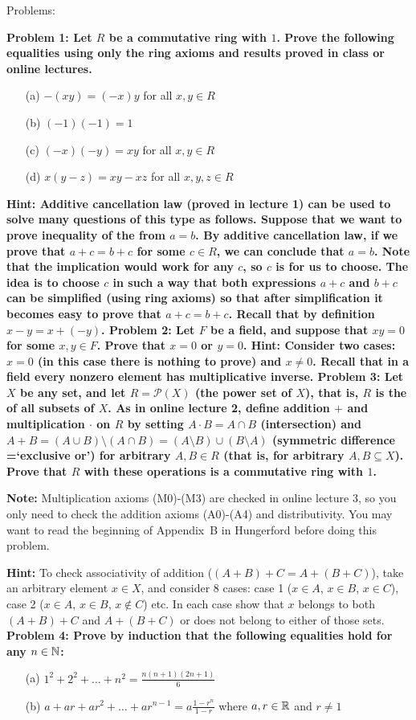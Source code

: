 \documentclass[11pt]{amsart}
\begin{document}
\skv
\bf\centerline{Problems: }\rm
\skv
\bf{Problem 1: }\rm Let $R$ be a commutative ring with $1$.
Prove the following equalities using only the ring axioms and 
results proved  in class or online lectures.
\begin{itemize}
\item[(a)] $-(xy)=(-x)y$ for all $x,y\in R$ 
\item[(b)] $(-1)(-1)=1$ 
\item[(c)] $(-x)(-y)=xy$ for all $x,y\in R$
\item[(d)] $x(y-z)=xy-xz$ for all $x,y,z\in R$ 
\end{itemize}
\bf{Hint: }\rm Additive cancellation law (proved in lecture 1) can be used to solve
many questions of this type as follows. Suppose that we want to prove inequality of
the from $a=b$. By additive cancellation law, if we prove that $a+c=b+c$ for some $c\in R$,
we can conclude that $a=b$. Note that the implication would work for any $c$, so $c$
is for us to choose. The idea is to choose $c$ in such a way that both expressions $a+c$
and $b+c$ can be simplified (using ring axioms) so that after simplification it becomes
easy to prove that $a+c=b+c$.
\skv
Recall that by definition $x-y=x+(-y)$.
\skv
\bf{Problem 2: }\rm Let $F$ be a field, and suppose that
$xy=0$ for some $x,y\in F$. Prove that $x=0$ or $y=0$.
\bf{Hint: }\rm Consider two cases: $x=0$ (in this case there is nothing
to prove) and $x\neq 0$. Recall that in a field every nonzero
element has multiplicative inverse.
\skv
\skv
\bf{Problem 3: }\rm Let $X$ be any set, and let $R=\mathcal P(X)$ (the power set of $X$), that is,
$R$ is the of all subsets of $X$. As in online lecture 2, define addition $+$ and multiplication $\cdot$ on $R$ by setting $A\cdot B=A\cap B$ (intersection) 
and $A+B=(A\cup B)\setminus (A\cap B)=(A\setminus B)\cup (B\setminus A)$ (symmetric difference =`exclusive or') 
for arbitrary $A,B\in R$ (that is, for arbitrary  $A,B\subseteq X$).
Prove that $R$ with these operations is a commutative ring with $1$. 

{\bf Note:} Multiplication axioms (M0)-(M3) are checked in online lecture 3, so you only need
to check the addition axioms (A0)-(A4) and distributivity. You may want to read the beginning of Appendix~B in Hungerford before
doing this problem.


{\bf Hint:} To check associativity of addition ($(A+B)+C=A+(B+C)$), take an arbitrary element $x\in X$,
and consider $8$ cases: case 1 ($x\in A$, $x\in B$, $x\in C$), case 2 ($x\in A$, $x\in B$, $x\not \in C$)
etc. In each case show that $x$ belongs to both $(A+B)+C$ and $A+(B+C)$ or does not belong to either of
those sets. 
\skv
\skv
\skv
\bf{Problem 4: }\rm Prove by induction that the following equalities hold for any $n\in{\mathbb N}$:
\begin{itemize}
\item[(a)] $1^2+2^2+\ldots+ n^2=\frac{n(n+1)(2n+1)}{6}$ 
\item[(b)] $a+ar+ar^2+\ldots+ar^{n-1}=a\frac{1-r^n}{1-r}$ where $a,r\in{\mathbb R}$ and $r\neq 1$
\end{itemize}
\end{document}
